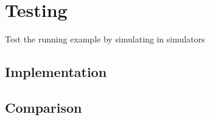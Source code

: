 \chapter{Testing}
Test the running example by simulating in simulators

\section{Implementation}

\section{Comparison}


